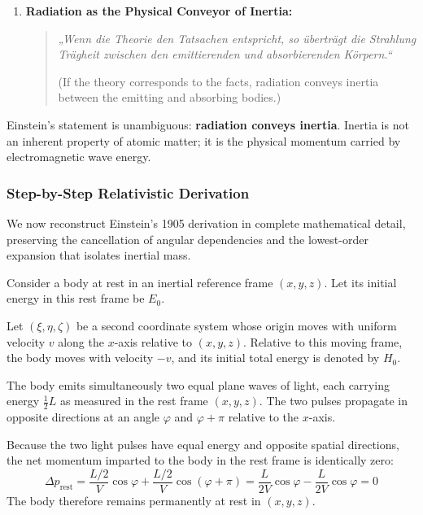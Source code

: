\documentclass[11pt,a4paper]{article}
\begin{document}
\begin{enumerate}
\begin{quote}
    (If a body gives off the energy $L$ in the form of radiation, its mass diminishes by $L/V^2$. Here it is obviously of no consequence whether the energy withdrawn from the body happens to turn into energy of radiation or not, so that we are led to the more general conclusion: The mass of a body is a measure of its energy content...)
    \end{quote}

    \item \textbf{Radiation as the Physical Conveyor of Inertia:}
    \begin{quote}
    \textit{„Wenn die Theorie den Tatsachen entspricht, so überträgt die Strahlung Trägheit zwischen den emittierenden und absorbierenden Körpern.“}
    
    (If the theory corresponds to the facts, radiation conveys inertia between the emitting and absorbing bodies.)
    \end{quote}
\end{enumerate}

Einstein's statement is unambiguous: \textbf{radiation conveys inertia}. Inertia is not an inherent property of atomic matter; it is the physical momentum carried by electromagnetic wave energy.

\subsubsection{Step-by-Step Relativistic Derivation}
\label{subsubsec:relativistic_derivation}

We now reconstruct Einstein's 1905 derivation in complete mathematical detail, preserving the cancellation of angular dependencies and the lowest-order expansion that isolates inertial mass.

Consider a body at rest in an inertial reference frame $(x, y, z)$. Let its initial energy in this rest frame be $E_0$.

Let $(\xi, \eta, \zeta)$ be a second coordinate system whose origin moves with uniform velocity $v$ along the $x$-axis relative to $(x, y, z)$. Relative to this moving frame, the body moves with velocity $-v$, and its initial total energy is denoted by $H_0$.

The body emits simultaneously two equal plane waves of light, each carrying energy $\frac{1}{2}L$ as measured in the rest frame $(x, y, z)$. The two pulses propagate in opposite directions at an angle $\varphi$ and $\varphi + \pi$ relative to the $x$-axis.

Because the two light pulses have equal energy and opposite spatial directions, the net momentum imparted to the body in the rest frame is identically zero:
\begin{equation}
\Delta p_{\text{rest}} = \frac{L/2}{V}\cos\varphi + \frac{L/2}{V}\cos(\varphi + \pi) = \frac{L}{2V}\cos\varphi - \frac{L}{2V}\cos\varphi = 0
\end{equation}
The body therefore remains permanently at rest in $(x, y, z)$.
\end{document}
